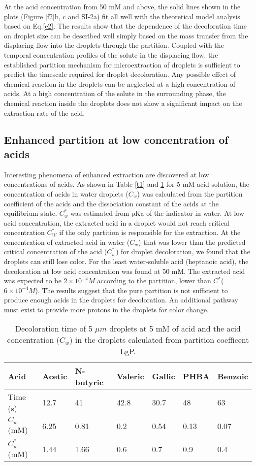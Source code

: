 \documentclass[journal=langd5,manuscript=article]{achemso}
\begin{document}
At the acid concentration from 50 mM and above, the solid lines shown in the plots (Figure \ref{f2}b, c and SI-2a) fit all well with the theoretical model analysis based on Eq.\ref{e2}. The results show that the dependence of the decoloration time on droplet size can be described well simply based on the mass transfer from the displacing flow into the droplets through the partition. Coupled with the temporal concentration profiles of the solute in the displacing flow, the established partition mechanism for microextraction of droplets is sufficient to predict the timescale required for droplet decoloration. Any possible effect of chemical reaction in the droplets can be neglected at a high concentration of acids. At a high concentration of the solute in the surrounding phase, the chemical reaction inside the droplets does not show a significant impact on the extraction rate of the acid.\\  

\subsection{Enhanced partition at low concentration of acids}
Interesting phenomena of enhanced extraction are discovered at low concentrations of acids. As shown in Table \ref{t1} and \ref{tt1} for 5 mM acid solution, the concentration of acids in water droplets ($C_w$) was calculated from the partition coefficient of the acids and the dissociation constant of the acids at the equilibrium state. $C^*_w$ was estimated from pKa of the indicator in water. At low acid concentration, the extracted acid in a droplet would not reach critical concentration $C^*_W$ if the only partition is responsible for the extraction. At the concentration of extracted acid in water ($C_w$) that was lower than the predicted critical concentration of the acid ($C^*_w$) for droplet decoloration, we found that the droplets can still lose color. For the least water-soluble acid (heptanoic acid), the decoloration at low acid concentration was found at 50 mM. The extracted acid was expected to be $2 \times 10^{-4}M$ according to the partition, lower than $C^*$($6 \times 10^{-4}M$). The results suggest that the pure partition is not sufficient to produce enough acids in the droplets for decoloration. An additional pathway must exist to provide more protons in the droplets for color change.  

\begin{table}[ht]
 \centering
 \caption{Decoloration time of 5 $\mu m$ droplets at 5 mM of acid and the acid concentration ($C_w$) in the droplets calculated from partition coefficent LgP.}
\begin{tabular}{p{2cm}|p{1.5cm}|p{1.5cm}|p{1.5cm}| p{1.5cm}| p{1.5cm}| p{1.5cm}}
\hline
Acid& Acetic & N-butyric & Valeric & Gallic & PHBA & Benzoic \\
\hline
Time (s)&12.7& 41& 42.8&30.7&48&63\\
\hline
$C_w$ (mM)&6.25& 0.81& 0.2&0.54&0.13&0.07\\
\hline
$C^*_w$ (mM) &1.44&1.66&0.6&0.7&0.9&0.4\\
\hline
\end{tabular}
\label{tt1}
\end{table}
\end{document}
